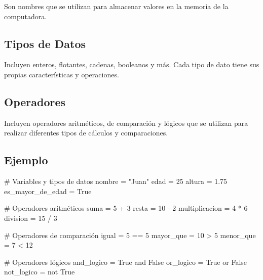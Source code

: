 \documentclass[
  a4paper,
  DIV=11,
  numbers=noendperiod,
  onepage,
  openany]{scrreprt}
\newenvironment{Shaded}{\begin{snugshade}}{\end{snugshade}}
\newcommand{\CommentTok}[1]{\textcolor[rgb]{0.37,0.37,0.37}{#1}}
\newcommand{\DecValTok}[1]{\textcolor[rgb]{0.68,0.00,0.00}{#1}}
\newcommand{\FloatTok}[1]{\textcolor[rgb]{0.68,0.00,0.00}{#1}}
\newcommand{\KeywordTok}[1]{\textcolor[rgb]{0.00,0.23,0.31}{#1}}
\newcommand{\NormalTok}[1]{\textcolor[rgb]{0.00,0.23,0.31}{#1}}
\newcommand{\OperatorTok}[1]{\textcolor[rgb]{0.37,0.37,0.37}{#1}}
\newcommand{\StringTok}[1]{\textcolor[rgb]{0.13,0.47,0.30}{#1}}
\newcommand{\VariableTok}[1]{\textcolor[rgb]{0.07,0.07,0.07}{#1}}
\begin{document}
Son nombres que se utilizan para almacenar valores en la memoria de la
computadora.

\hypertarget{tipos-de-datos-1}{%
\subsection{Tipos de Datos}\label{tipos-de-datos-1}}

Incluyen enteros, flotantes, cadenas, booleanos y más. Cada tipo de dato
tiene sus propias características y operaciones.

\hypertarget{operadores-1}{%
\subsection{Operadores}\label{operadores-1}}

Incluyen operadores aritméticos, de comparación y lógicos que se
utilizan para realizar diferentes tipos de cálculos y comparaciones.

\hypertarget{ejemplo-5}{%
\subsection{Ejemplo}\label{ejemplo-5}}

\begin{Shaded}
\begin{Highlighting}[]

\CommentTok{\# Variables y tipos de datos}
\NormalTok{nombre }\OperatorTok{=} \StringTok{"Juan"}
\NormalTok{edad }\OperatorTok{=} \DecValTok{25}
\NormalTok{altura }\OperatorTok{=} \FloatTok{1.75}
\NormalTok{es\_mayor\_de\_edad }\OperatorTok{=} \VariableTok{True}

\CommentTok{\# Operadores aritméticos}
\NormalTok{suma }\OperatorTok{=} \DecValTok{5} \OperatorTok{+} \DecValTok{3}
\NormalTok{resta }\OperatorTok{=} \DecValTok{10} \OperatorTok{{-}} \DecValTok{2}
\NormalTok{multiplicacion }\OperatorTok{=} \DecValTok{4} \OperatorTok{*} \DecValTok{6}
\NormalTok{division }\OperatorTok{=} \DecValTok{15} \OperatorTok{/} \DecValTok{3}

\CommentTok{\# Operadores de comparación}
\NormalTok{igual }\OperatorTok{=} \DecValTok{5} \OperatorTok{==} \DecValTok{5}
\NormalTok{mayor\_que }\OperatorTok{=} \DecValTok{10} \OperatorTok{\textgreater{}} \DecValTok{5}
\NormalTok{menor\_que }\OperatorTok{=} \DecValTok{7} \OperatorTok{\textless{}} \DecValTok{12}

\CommentTok{\# Operadores lógicos}
\NormalTok{and\_logico }\OperatorTok{=} \VariableTok{True} \KeywordTok{and} \VariableTok{False}
\NormalTok{or\_logico }\OperatorTok{=} \VariableTok{True} \KeywordTok{or} \VariableTok{False}
\NormalTok{not\_logico }\OperatorTok{=} \KeywordTok{not} \VariableTok{True}
\end{Highlighting}
\end{Shaded}
\end{document}
